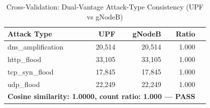 \begin{table}[htbp]
\centering
\caption{Cross-Validation: Dual-Vantage Attack-Type Consistency (UPF vs gNodeB)}\label{tab:cv_dual_vantage}
\begin{tabular}{lrrrr}
\toprule
\textbf{Attack Type} & \textbf{UPF} & \textbf{gNodeB} & \textbf{Ratio} \\
\midrule
dns\_amplification & 20,514 & 20,514 & 1.000 \\
http\_flood & 33,105 & 33,105 & 1.000 \\
tcp\_syn\_flood & 17,845 & 17,845 & 1.000 \\
udp\_flood & 22,249 & 22,249 & 1.000 \\
\midrule
\multicolumn{4}{l}{\textbf{Cosine similarity: 1.0000, count ratio: 1.000 — PASS}} \\
\bottomrule
\end{tabular}
\end{table}
